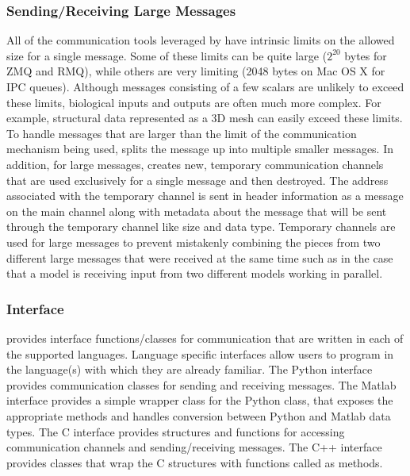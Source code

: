 \documentclass[journal]{IEEEtran}
\newcommand{\todo}[1]{{\color{red}{#1}}}
\newcommand{\pkg}{{\tt \todo{cis\_interface}}{}}
\begin{document}
\subsubsection{Sending/Receiving Large Messages}\label{SSS:large}
%
All of the communication tools leveraged by {\pkg} have intrinsic limits 
on the allowed size for a single message. Some of these limits can be quite large 
($2^{20}$ bytes for ZMQ and RMQ), while others are very limiting 
(2048 bytes on Mac OS X for IPC queues). Although messages consisting of a few scalars are unlikely to 
exceed these limits, biological inputs and outputs are often much more complex. 
For example, structural data represented as a 3D mesh can easily exceed these 
limits. To handle messages that are larger than the limit of the communication 
mechanism being used, {\pkg} splits the message up into multiple smaller 
messages. In addition, for large messages, {\pkg} creates new, temporary 
communication channels that are used exclusively for a single message and 
then destroyed. The address associated with the temporary channel is sent in 
header information as a message on the main channel along with metadata about 
the message that will be sent through the temporary channel like size and data type. 
Temporary channels are used for large messages to prevent mistakenly combining 
the pieces from two different large messages that were received at the same time 
such as in the case that a model is receiving input from two different models 
working in parallel.

\subsubsection{Interface}\label{SSS:interface}
%
{\pkg} provides interface functions/classes for communication that are 
written in each of the supported languages. Language specific interfaces 
allow users to program in the 
language(s) with which they are already familiar. The Python interface provides 
communication classes for sending and receiving messages. The Matlab 
interface provides a simple wrapper class for the Python class, that exposes 
the appropriate methods and handles conversion between Python and Matlab 
data types. The C interface provides structures and functions for accessing 
communication channels and sending/receiving messages. The C++ interface 
provides classes that wrap the C structures with functions called as methods.
\end{document}
